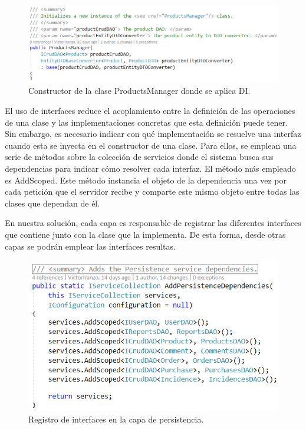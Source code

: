 \documentclass[11pt,spanish,listoffigures]{tfgetsinf}
\begin{document}
\begin{figure}[h]
\centering
\includegraphics[scale=0.8]{ProductsManager}
\caption{Constructor de la clase ProductsManager donde se aplica DI.}
\end{figure}

El uso de interfaces reduce el acoplamiento entre la definición de las operaciones de una clase y las implementaciones concretas que esta definición puede tener. Sin embargo, es necesario indicar con qué implementación se resuelve una interfaz cuando esta se inyecta en el constructor de una clase. Para ellos, se emplean una serie de métodos sobre la colección de servicios donde el sistema busca sus dependencias para indicar cómo resolver cada interfaz. El método más empleado es AddScoped. Este método instancia el objeto de la dependencia una vez por cada petición que el servidor recibe y comparte este mismo objeto entre todas las clases que dependan de él.

En nuestra solución, cada capa es responsable de registrar las diferentes interfaces que contiene junto con la clase que la implementa. De esta forma, desde otras capas se podrán emplear las interfaces resultas.

\begin{figure}[h]
\centering
\includegraphics[scale=0.9]{ResolucionDependencias}
\caption{Registro de interfaces en la capa de persistencia.}
\end{figure}
\end{document}

